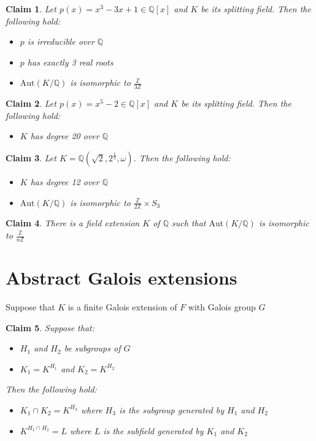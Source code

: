 \documentclass{article}
\newtheorem{claim}{Claim}
\begin{document}
\begin{claim}
  Let $p(x)=x^3-3x+1 \in \mathbb{Q}[x]$ and $K$ be its splitting field. Then the following hold:
  \begin{itemize}
    \item $p$ is irreducible over $\mathbb{Q}$
    \item $p$ has exactly 3 real roots
    \item $\text{Aut}(K/\mathbb{Q})$ is isomorphic to $\frac{\mathbb{Z}}{3\mathbb{Z}}$
  \end{itemize}
\end{claim}

\begin{claim}
  Let $p(x)=x^5-2 \in \mathbb{Q}[x]$ and $K$ be its splitting field. Then the following hold:
  \begin{itemize}
    \item $K$ has degree 20 over $\mathbb{Q}$
  \end{itemize}
\end{claim}

\begin{claim}
  Let $K=\mathbb{Q}(\sqrt{2},2^\frac{1}{3},\omega)$. Then the following hold:
  \begin{itemize}
    \item $K$ has degree 12 over $\mathbb{Q}$
    \item $\text{Aut}(K/\mathbb{Q})$ is isomorphic to $\frac{\mathbb{Z}}{2\mathbb{Z}} \times S_3$
  \end{itemize}
\end{claim}

\begin{claim}
  There is a field extension $K$ of $\mathbb{Q}$ such that $\text{Aut}(K/\mathbb{Q})$ is isomorphic to $\frac{\mathbb{Z}}{n\mathbb{Z}}$
\end{claim}

\section{Abstract Galois extensions}

Suppose that $K$ is a finite Galois extension of $F$ with Galois group $G$

\begin{claim}
  Suppose that:
  \begin{itemize}
    \item $H_1$ and $H_2$ be subgroups of $G$
    \item $K_1=K^{H_1}$ and $K_2=K^{H_2}$
  \end{itemize}

  Then the following hold:
  \begin{itemize}
    \item $K_1 \cap K_2 = K^{H_3}$ where $H_3$ is the subgroup generated by $H_1$ and $H_2$
    \item $K^{H_1 \cap H_2} = L$ where $L$ is the subfield generated by $K_1$ and $K_2$
  \end{itemize}
\end{claim}
\end{document}
